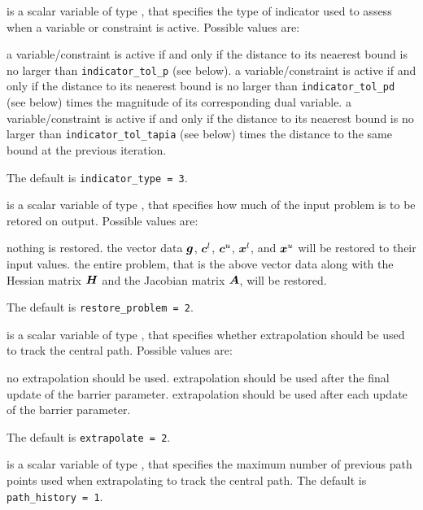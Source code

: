 \begin{description}

 is a scalar variable of type \integer, 
that specifies the type of indicator used to assess when a variable or
constraint is active.
Possible values are:

\begin{description}
 a variable/constraint is active if and only if the distance 
to its neaerest bound is no larger than {\tt indicator\_tol\-\_p} (see below).
 a variable/constraint is active if and only if the distance 
to its neaerest bound is no larger than {\tt indicator\_tol\-\_pd} 
(see below) times the magnitude of its corresponding dual variable.
 a variable/constraint is active if and only if the distance 
to its neaerest bound is no larger than {\tt indicator\_tol\-\_tapia} 
(see below) times the distance to the same bound at the previous iteration.
\end{description}
The default is {\tt indicator\_type = 3}.

 is a scalar variable of type \integer, that 
specifies how much of the input problem is to be retored on output. 
Possible values are:
\begin{description}
 nothing is restored. 
 the vector data ${\bm{g}}$, 
   ${\bm{c}}^{l}$, ${\bm{c}}^{u}$, ${\bm{x}}^{l}$, and ${\bm{x}}^{u}$ 
   will be restored to their input values.
 the entire problem, that is the above vector data along with 
the Hessian matrix ${\bm{H}}$ and the Jacobian matrix ${\bm{A}}$, will be restored.
\end{description}
The default is {\tt restore\_problem = 2}.

 is a scalar variable of type \integer, that 
specifies whether extrapolation should be used to track the central path. 
Possible values are:
\begin{description}
 no extrapolation should be used.
 extrapolation should be used after the final update of the barrier 
        parameter.
 extrapolation should be used after each update of the barrier 
        parameter.
\end{description}
The default is {\tt extrapolate = 2}.

 is a scalar variable of type \integer, that 
specifies the maximum number of previous path points used when extrapolating
to track the central path.
The default is {\tt path\_history = 1}.


\end{description}
